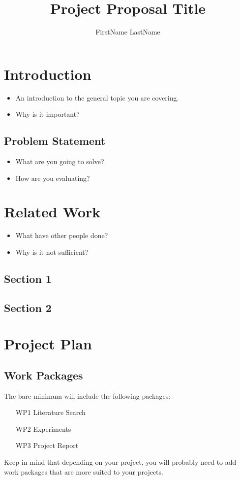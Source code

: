 \documentclass[rnd]{mas_proposal}
\title{Project Proposal Title}
\author{FirstName LastName}
\begin{document}
\maketitle

\pagestyle{plain}

\chapter{Introduction}
\begin{itemize}
    \item An introduction to the general topic you are covering.
    \item Why is it important?
\end{itemize}

\section{Problem Statement}
\begin{itemize}
    \item What are you going to solve?
    \item How are you evaluating?
\end{itemize}


\chapter{Related Work}
\begin{itemize}
    \item What have other people done?
    \item Why is it not sufficient?
\end{itemize}

\section{Section 1}
\section{Section 2}



\chapter{Project Plan}

\section{Work Packages}
The bare minimum will include the following packages:
\begin{enumerate}
    \item[WP1] Literature Search
    \item[WP2] Experiments
    \item[WP3] Project Report
\end{enumerate}
Keep in mind that depending on your project, you will probably need to add work packages that are more suited to your projects.
\end{document}
